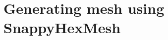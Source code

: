 \chapter{Generating mesh using SnappyHexMesh}
\thispagestyle{empty}
\label{sec:chap14}
\newcommand{\LocCHonefourfig}{\Origin/CHAPTERS/chap14/figures}

